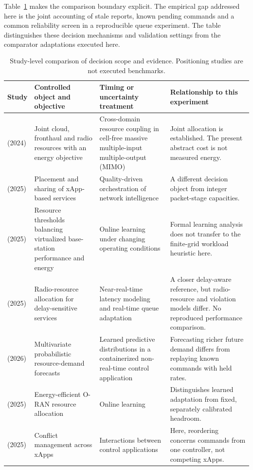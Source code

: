\documentclass{IEEEoj}
\begin{document}
Table~\ref{tab:related} makes the comparison boundary explicit. The empirical
gap addressed here is the joint accounting of stale reports, known pending
commands and a common reliability screen in a reproducible queue experiment.
The table distinguishes these decision mechanisms and validation settings from the comparator adaptations executed here.
\begin{table}[!t]\centering\small
\caption{Study-level comparison of decision scope and evidence. Positioning studies are not executed benchmarks.}
\label{tab:related}
\begin{tabular}{>{\raggedright\arraybackslash}p{23mm}>{\raggedright\arraybackslash}p{43mm}>{\raggedright\arraybackslash}p{47mm}>{\raggedright\arraybackslash}p{47mm}}
\toprule Study & Controlled object and objective & Timing or uncertainty treatment & Relationship to this experiment\\\midrule
\cite{demir} (2024) & Joint cloud, fronthaul and radio resources with an energy objective & Cross-domain resource coupling in cell-free massive multiple-input multiple-output (MIMO) & Joint allocation is established. The present abstract cost is not measured energy.\\
\cite{oreo} (2025) & Placement and sharing of xApp-based services & Quality-driven orchestration of network intelligence & A different decision object from integer packet-stage capacities.\\
\cite{kalntis} (2025) & Resource thresholds balancing virtualized base-station performance and energy & Online learning under changing operating conditions & Formal learning analysis does not transfer to the finite-grid workload heuristic here.\\
\cite{marea} (2025) & Radio-resource allocation for delay-sensitive services & Near-real-time latency modeling and real-time queue adaptation & A closer delay-aware reference, but radio-resource and violation models differ. No reproduced performance comparison.\\
\cite{kasuluru} (2026) & Multivariate probabilistic resource-demand forecasts & Learned predictive distributions in a containerized non-real-time control application & Forecasting richer future demand differs from replaying known commands with held rates.\\
\cite{sora} (2025) & Energy-efficient O-RAN resource allocation & Online learning & Distinguishes learned adaptation from fixed, separately calibrated headroom.\\
\cite{comix} (2025) & Conflict management across xApps & Interactions between control applications & Here, reordering concerns commands from one controller, not competing xApps.\\

\end{tabular}
\end{table}
\end{document}
